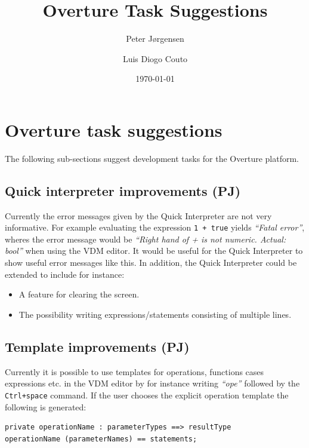\documentclass[11pt]{report}
\begin{document}
\title{Overture Task Suggestions}

\date{\today}

\author{
Peter J\o rgensen
\and Luis Diogo Couto
}

\maketitle

\section*{Overture task suggestions}

The following sub-sections suggest development tasks for the Overture platform.

\subsection*{Quick interpreter improvements (PJ)}

Currently the error messages given by the Quick Interpreter are not very informative. For example evaluating the expression \texttt{1 + true} yields \textit{``Fatal error''}, wheres the error message would be \textit{``Right hand of + is not numeric. Actual: bool''} when using the VDM editor. It would be useful for the Quick Interpreter to show useful error messages like this. In addition, the Quick Interpreter could be extended to include for instance:

\begin{itemize}

\item A feature for clearing the screen.

\item The possibility writing expressions/statements consisting of multiple lines.

\end{itemize}


\subsection*{Template improvements (PJ)}

Currently it is possible to use templates for operations, functions cases expressions etc. in the VDM editor by for instance writing \textit{``ope''} followed by the \texttt{Ctrl+space} command. If the user chooses the explicit operation template the following is generated:

\begin{lstlisting}
private operationName : parameterTypes ==> resultType
operationName (parameterNames) == statements;
\end{lstlisting}
\end{document}
